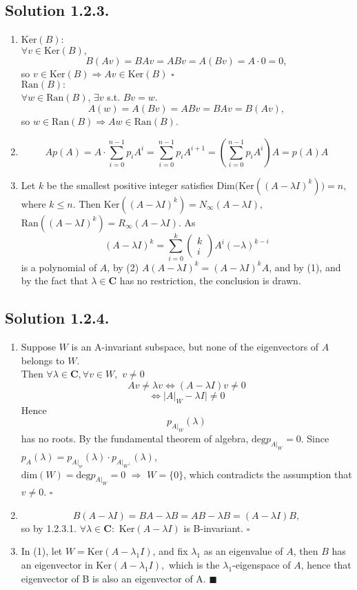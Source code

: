 \documentclass{article}
\begin{document}
\subsection*{Solution 1.2.3.}
\begin{enumerate}
    \item $\mathrm{Ker}(B)$:\\
    $\forall v\in \mathrm{Ker}(B),$
    \[B(Av)=BAv=ABv=A(Bv)=A\cdot 0 =0,\]
    so $v\in \mathrm{Ker}(B) \Rightarrow Av \in \mathrm{Ker}(B)$   $\square$ \\
    $\mathrm{Ran}(B):$ \\
    $\forall w\in\mathrm{Ran}(B)$, $\exists v$ s.t. $Bv=w$.
    \[A(w)=A(Bv)=ABv=BAv=B(Av),\]
    so $w\in\mathrm{Ran}(B)\Rightarrow Aw\in \mathrm{Ran}(B)$.
    \item
    \[Ap(A)=A\cdot \sum_{i=0}^{n-1} p_i A^i=\sum_{i=0}^{n-1} p_i A^{i+1}=(\sum_{i=0}^{n-1}p_iA^i)A=p(A)A\]
    \item Let $k$ be the smallest positive integer satisfies $\mathrm{Dim(}\mathrm{Ker}((A-\lambda I)^k)) = n$, where $k\leq n$. Then $\mathrm{Ker}((A-\lambda I)^k)=N_\infty(A-\lambda I)$, $\mathrm{Ran}((A-\lambda I)^k)=R_\infty(A-\lambda I)$.
    As 
    \[(A-\lambda I)^k=\sum_{i=0}^k\left(\begin{array}{r} k \\ i 
    \end{array}\right) A^i(-\lambda)^{k-i} \]
    is a polynomial of $A$, by (2) $A(A-\lambda I)^k=(A-\lambda I)^k A$, and by (1), and by the fact that $\lambda\in\mathbf{C}$ has no restriction, the conclusion is drawn.
\end{enumerate}
\subsection*{Solution 1.2.4.}
\begin{enumerate}
    \item Suppose $W$ is an A-invariant subspace, but none of the eigenvectors of $A$ belongs to $W$.\\
    Then $\forall \lambda \in \mathbf{C}, \forall v \in W,$  $v\neq 0$
    \[Av\neq \lambda v \Leftrightarrow (A-\lambda I)v\neq 0 \]
    \[\Leftrightarrow |A|_W-\lambda I| \neq 0\]
    Hence
    \[p_{A|_W}(\lambda)\]
    has no roots. By the fundamental theorem of algebra, $\mathrm{deg} p_{A|_W} = 0$.
    Since $p_A(\lambda)=p_{A|_w}(\lambda)\cdot p_{A|_{W^\perp}}(\lambda)$,\\
    $\mathrm{dim}(W)=\mathrm{deg} p_{A|_W}=0$ $\Rightarrow$ $W=\{0\}$, which contradicts the assumption that $v\neq 0$.  $\square$
    \item
    \[B(A-\lambda I)=BA-\lambda B=AB-\lambda B=(A-\lambda I)B,\]
    so by 1.2.3.1. $\forall \lambda \in \mathbf{C}:$ $\mathrm{Ker}(A-\lambda I)$ is B-invariant. $\square$
    \item In (1), let $W=\mathrm{Ker}(A-\lambda_1 I)$, and fix $\lambda_1$ as an eigenvalue of $A$, then $B$ has an eigenvector in $\mathrm{Ker}(A-\lambda_1 I),$ which is the $\lambda_1$-eigenspace of $A$, hence that eigenvector of B is also an eigenvector of A. $\blacksquare$
\end{enumerate}
\end{document}
